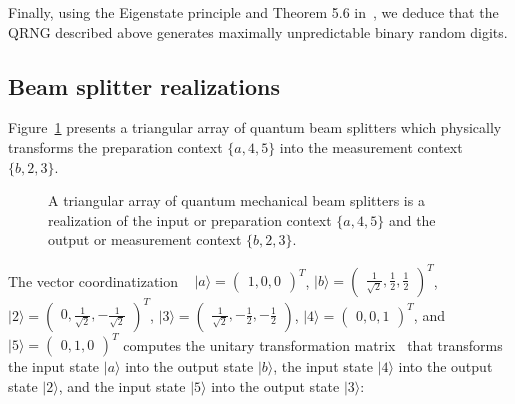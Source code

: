 \documentclass[%
 superscriptaddress,
  preprint,
 showpacs,
 showkeys,
 nofootinbib,
  amsmath,amssymb,
  aps,
 pra,
  longbibliography,
  floatfix,
 ]{revtex4-2}
\theoremstyle{definition}
\begin{document}
Finally, using the Eigenstate principle
and Theorem 5.6 in~\cite{RSPA23}, we deduce that the QRNG described above generates maximally unpredictable binary random digits.
\subsection{Beam splitter realizations}

Figure~\ref{2023-viext-bsr} presents a triangular array of quantum  beam splitters
 which physically transforms the preparation context  $\{a,4,5\}$
into the measurement context $\{b,2,3\}$.

\begin{figure}[ht]
\begin{center}
\end{center}
\caption{A triangular array of quantum mechanical beam splitters is a realization of the input or preparation context $\{a,4,5\}$ and the output or measurement context $\{b,2,3\}$.
\label{2023-viext-bsr}}
\end{figure}


The vector coordinatization ~\cite[Table~I]{2018-minimalYIYS}
$\vert a \rangle = \begin{pmatrix} 1, 0, 0\end{pmatrix}^T$,
$\vert b \rangle = \begin{pmatrix} \frac1{\sqrt{2}}, \frac12, \frac12 \end{pmatrix}^T$,
$\vert 2 \rangle = \begin{pmatrix} 0, \frac1{\sqrt{2}}, -\frac1{\sqrt{2}} \end{pmatrix}^T$,
$\vert 3 \rangle = \begin{pmatrix} \frac1{\sqrt{2}}, -\frac12, -\frac12 \end{pmatrix}$,
$\vert 4 \rangle = \begin{pmatrix} 0, 0, 1\end{pmatrix}^T$, and
$\vert 5 \rangle = \begin{pmatrix} 0, 1, 0\end{pmatrix}^T$
computes the unitary transformation matrix~\cite{Schwinger.60,Joglekar-I}
that transforms the input state $\vert a\rangle$ into the output state $\vert b\rangle$,
 the input state $\vert 4\rangle$ into the output state $\vert 2\rangle$,
and  the input state $\vert 5\rangle$ into the output state $\vert 3\rangle$:
\end{document}
